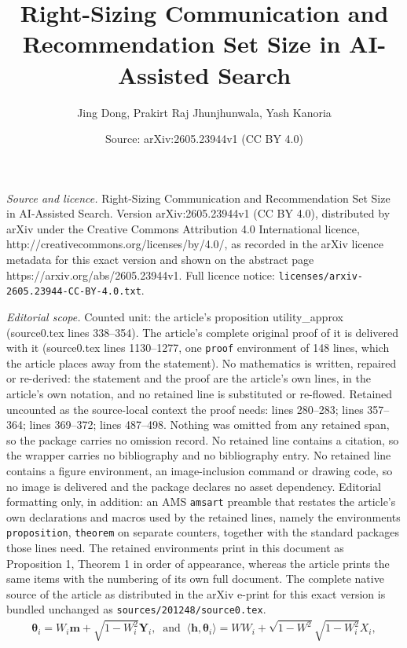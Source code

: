 \documentclass[10pt,a4paper]{amsart}
\title{Right-Sizing Communication and Recommendation Set Size in AI-Assisted Search}
\author{Jing Dong, Prakirt Raj Jhunjhunwala, Yash Kanoria}
\date{Source: arXiv:2605.23944v1 (CC BY 4.0)}
\begin{document}
\maketitle

\noindent\emph{Source and licence.} Right-Sizing Communication and Recommendation Set Size in AI-Assisted Search. Version arXiv:2605.23944v1 (CC BY 4.0), distributed by arXiv under the Creative Commons Attribution 4.0 International licence, http://creativecommons.org/licenses/by/4.0/, as recorded in the arXiv licence metadata for this exact version and shown on the abstract page https://arxiv.org/abs/2605.23944v1. Full licence notice: \texttt{licenses/arxiv-2605.23944-CC-BY-4.0.txt}.\par\smallskip

\noindent\textit{Editorial scope.} Counted unit: the article's proposition utility\_approx (source0.tex lines 338--354). The article's complete original proof of it is delivered with it (source0.tex lines 1130--1277, one \texttt{proof} environment of 148 lines, which the article places away from the statement). No mathematics is written, repaired or re-derived: the statement and the proof are the article's own lines, in the article's own notation, and no retained line is substituted or re-flowed.  Retained uncounted as the source-local context the proof needs: lines 280--283; lines 357--364; lines 369--372; lines 487--498.  Nothing was omitted from any retained span, so the package carries no omission record.  No retained line contains a citation, so the wrapper carries no bibliography and no bibliography entry.  No retained line contains a figure environment, an image-inclusion command or drawing code, so no image is delivered and the package declares no asset dependency.  Editorial formatting only, in addition: an AMS \texttt{amsart} preamble that restates the article's own declarations and macros used by the retained lines, namely the environments \texttt{proposition}, \texttt{theorem} on separate counters, together with the standard packages those lines need.  The retained environments print in this document as Proposition 1, Theorem 1 in order of appearance, whereas the article prints the same items with the numbering of its own full document.  The complete native source of the article as distributed in the arXiv e-print for this exact version is bundled unchanged as \texttt{sources/201248/source0.tex}.
\begin{align}
\label{eq:util_representation}
    \boldsymbol\theta_i = W_i \mathbf{m} + \sqrt{1-W_i^2} \mathbf{Y}_i, \ \text{ and } \ \langle \mathbf{h} , \boldsymbol{\theta}_i \rangle = W W_i + \sqrt{1-W^2} \sqrt{1-W_i^2} X_i,
\end{align}
\end{document}
